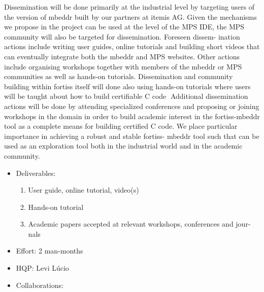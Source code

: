 Dissemination will be done primarily at the industrial level by targeting users
of the version of mbeddr built by our partners at itemis AG. Given the mechanisms we propose in the project can be used at the level of the MPS IDE, the
MPS community will also be targeted for dissemination. Foreseen dissem- ination
actions include writing user guides, online tutorials and building short videos
that can eventually integrate both the mbeddr and MPS websites. Other actions
include organising workshops together with members of the mbeddr or MPS
communities as well as hands-on tutorials. Dissemination and community building
within fortiss itself will done also using hands-on tutorials where users will
be taught about how to build certifiable C code􏰁 Additional
dissemination actions will be done by attending specialized
conferences and proposing or joining
workshops in the domain in order to build academic interest in the fortiss-mbeddr tool as a complete means for building certified C code.
We place particular importance in achieving a robust and stable fortiss- mbeddr
tool such that can be used as an exploration tool both in the industrial world
and in the academic community.

\begin{itemize}
  \item Deliverables:
  \begin{enumerate}
    \item User guide, online tutorial, video(s)
	\item Hands-on tutorial
	\item Academic papers accepted at relevant workshops, conferences and jour-
nals
  \end{enumerate}
  \item Effort: 2 man-months
  \item HQP: Levi L\'ucio
  \item Collaborations:
\end{itemize}